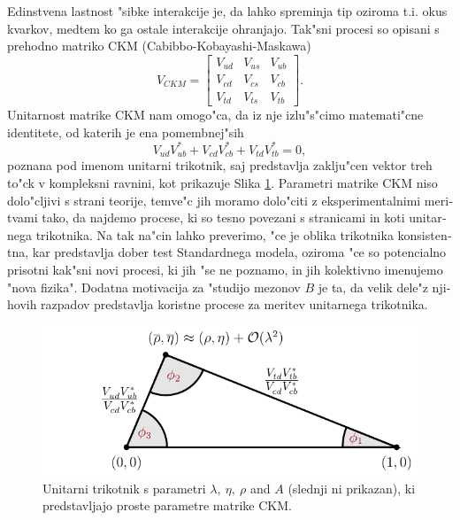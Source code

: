 \documentclass[headings=standardclasses,headings=big,oneside,a4paper,openany,12pt]{scrbook}
\begin{document}
\begin{otherlanguage}{slovene}
Edinstvena lastnost "sibke interakcije je, da lahko spreminja tip oziroma t.i. okus kvarkov, medtem ko ga ostale interakcije ohranjajo. Tak"sni procesi so opisani s prehodno matriko CKM (Cabibbo-Kobayashi-Maskawa) \cite{cabibbo1963unitary,kobayashi1973cp}
\begin{equation}
V_{CKM} = \begin{bmatrix}
    V_{ud} & V_{us} & V_{ub}\\
	V_{cd} & V_{cs} & V_{cb}\\
	V_{td} & V_{ts} & V_{tb}
\end{bmatrix}.
\end{equation}
Unitarnost matrike CKM nam omogo"ca, da iz nje izlu"s"cimo matemati"cne identitete, od katerih je ena pomembnej"sih
\begin{equation}
V_{ud}V_{ub}^* + V_{cd}V_{cb}^* + V_{td}V_{tb}^* = 0,
\end{equation}
poznana pod imenom unitarni trikotnik, saj predstavlja zaklju"cen vektor treh to"ck v kompleksni ravnini, kot prikazuje Slika \ref{fig:ut_si}. Parametri matrike CKM niso dolo"cljivi s strani teorije, temve"c jih moramo dolo"citi z eksperimentalnimi meritvami tako, da najdemo procese, ki so tesno povezani s stranicami in koti unitarnega trikotnika. Na tak na"cin lahko preverimo, "ce je oblika trikotnika konsistentna, kar predstavlja dober test Standardnega modela, oziroma "ce so potencialno prisotni kak"sni novi procesi, ki jih "se ne poznamo, in jih kolektivno imenujemo "nova fizika". Dodatna motivacija za "studijo mezonov $B$ je ta, da velik dele"z njihovih razpadov predstavlja koristne procese za meritev unitarnega trikotnika.
\begin{figure}[H]
\centering
\includegraphics[scale=1]{texfig/UT_Triangle}
\caption{Unitarni trikotnik s parametri $\lambda,~\eta,~\rho$ and $A$ (slednji ni prikazan), ki predstavljajo proste parametre matrike CKM.} %
\label{fig:ut_si}
\end{figure}


\end{otherlanguage}
\end{document}
